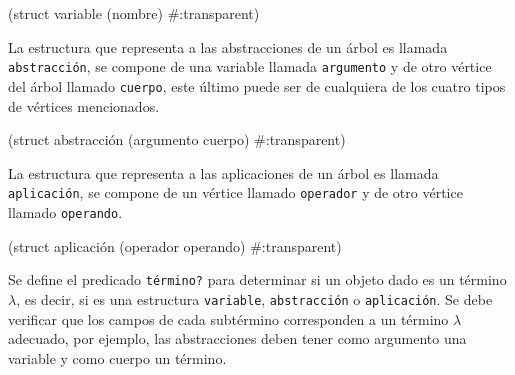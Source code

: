 \nwenddocs{}\endmoddef
(struct variable (nombre) #:transparent)

\eatline
{}\nwendcode{}\nwdocspar

La estructura que representa a las abstracciones de un árbol es llamada {\tt{}\protect{}abstracción}, se compone de una variable llamada {\tt{}argumento} y de otro vértice del árbol llamado {\tt{}cuerpo}, este último puede ser de cualquiera de los cuatro tipos de vértices mencionados.


\nwenddocs{}\plusendmoddef
(struct abstracción (argumento cuerpo) #:transparent)

\eatline
{}\nwendcode{}\nwdocspar

La estructura que representa a las aplicaciones de un árbol es llamada {\tt{}\protect{}aplicación}, se compone de un vértice llamado {\tt{}operador} y de otro vértice llamado {\tt{}operando}.


\nwenddocs{}\plusendmoddef
(struct aplicación (operador operando) #:transparent)

\eatline
{}\nwendcode{}\nwdocspar

Se define el predicado {\tt{}\protect{}término?} para determinar si un objeto dado es un término \( λ \), es decir, si es una estructura {\tt{}\protect{}variable}, {\tt{}\protect{}abstracción} o {\tt{}\protect{}aplicación}. Se debe verificar que los campos de cada subtérmino corresponden a un término \( λ \) adecuado, por ejemplo, las abstracciones deben tener como argumento una variable y como cuerpo un término.

